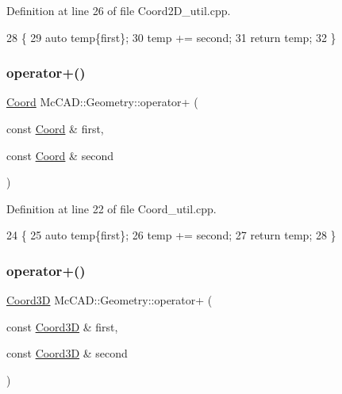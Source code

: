 Definition at line 26 of file Coord2\+D\+\_\+util.\+cpp.


\begin{DoxyCode}
28                               \{
29     \textcolor{keyword}{auto} temp\{first\};
30     temp += second;
31     \textcolor{keywordflow}{return} temp;
32 \}
\end{DoxyCode}
\mbox{\label{namespaceMcCAD_1_1Geometry_a77561412a1bc5f4077dd73172b957096}} 
\subsubsection{\texorpdfstring{operator+()}{operator+()}\hspace{0.1cm}{\footnotesize\ttfamily [5/6]}}
{\footnotesize\ttfamily \hyperlink{classMcCAD_1_1Geometry_1_1Coord}{Coord} Mc\+C\+A\+D\+::\+Geometry\+::operator+ (\begin{DoxyParamCaption}\item[{const \hyperlink{classMcCAD_1_1Geometry_1_1Coord}{Coord} \&}]{first,  }\item[{const \hyperlink{classMcCAD_1_1Geometry_1_1Coord}{Coord} \&}]{second }\end{DoxyParamCaption})}



Definition at line 22 of file Coord\+\_\+util.\+cpp.


\begin{DoxyCode}
24                             \{
25     \textcolor{keyword}{auto} temp\{first\};
26     temp += second;
27     \textcolor{keywordflow}{return} temp;
28 \}
\end{DoxyCode}
\mbox{\label{namespaceMcCAD_1_1Geometry_a98c98429542a57a370528720836e7340}} 
\subsubsection{\texorpdfstring{operator+()}{operator+()}\hspace{0.1cm}{\footnotesize\ttfamily [6/6]}}
{\footnotesize\ttfamily \hyperlink{classMcCAD_1_1Geometry_1_1Coord3D}{Coord3D} Mc\+C\+A\+D\+::\+Geometry\+::operator+ (\begin{DoxyParamCaption}\item[{const \hyperlink{classMcCAD_1_1Geometry_1_1Coord3D}{Coord3D} \&}]{first,  }\item[{const \hyperlink{classMcCAD_1_1Geometry_1_1Coord3D}{Coord3D} \&}]{second }\end{DoxyParamCaption})}



